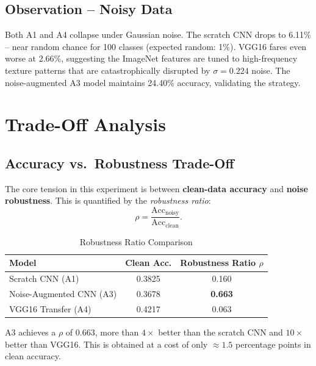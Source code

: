 \documentclass[12pt,a4paper]{article}
\begin{document}
\subsection{Observation -- Noisy Data}

Both A1 and A4 collapse under Gaussian noise. The scratch CNN drops to 6.11\% -- near random chance for 100 classes (expected random: 1\%). VGG16 fares even worse at 2.66\%, suggesting the ImageNet features are tuned to high-frequency texture patterns that are catastrophically disrupted by $\sigma = 0.224$ noise. The noise-augmented A3 model maintains 24.40\% accuracy, validating the strategy.

\section{Trade-Off Analysis}

\subsection{Accuracy vs.\ Robustness Trade-Off}

The core tension in this experiment is between \textbf{clean-data accuracy} and \textbf{noise robustness}. This is quantified by the \emph{robustness ratio}:
\begin{equation}
    \rho = \frac{\text{Acc}_{\text{noisy}}}{\text{Acc}_{\text{clean}}}.
\end{equation}

\begin{table}[H]
\centering
\caption{Robustness Ratio Comparison}
\begin{tabular}{lcc}
\toprule
\textbf{Model} & \textbf{Clean Acc.} & \textbf{Robustness Ratio $\rho$} \\
\midrule
Scratch CNN (A1)         & 0.3825 & 0.160 \\
Noise-Augmented CNN (A3) & 0.3678 & \textbf{0.663} \\
VGG16 Transfer (A4)      & 0.4217 & 0.063 \\
\bottomrule
\end{tabular}
\end{table}

A3 achieves a $\rho$ of 0.663, more than $4\times$ better than the scratch CNN and $10\times$ better than VGG16. This is obtained at a cost of only $\approx 1.5$ percentage points in clean accuracy.
\end{document}
